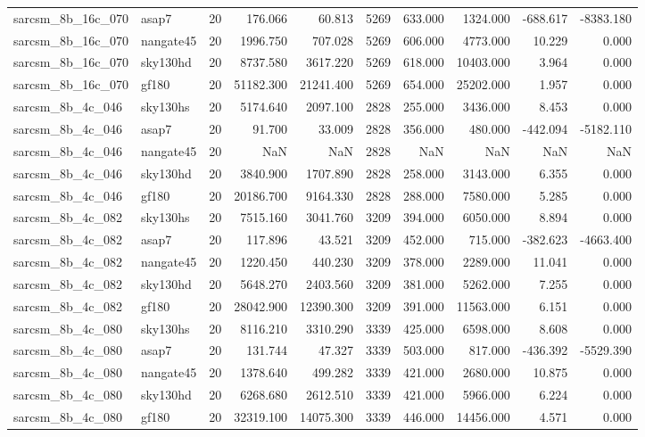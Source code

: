 \begin{longtable}{llrrrrrrrr}
sarcsm\_8b\_16c\_070 & asap7 & 20 & 176.066 & 60.813 & 5269 & 633.000 & 1324.000 & -688.617 & -8383.180 \\
sarcsm\_8b\_16c\_070 & nangate45 & 20 & 1996.750 & 707.028 & 5269 & 606.000 & 4773.000 & 10.229 & 0.000 \\
sarcsm\_8b\_16c\_070 & sky130hd & 20 & 8737.580 & 3617.220 & 5269 & 618.000 & 10403.000 & 3.964 & 0.000 \\
sarcsm\_8b\_16c\_070 & gf180 & 20 & 51182.300 & 21241.400 & 5269 & 654.000 & 25202.000 & 1.957 & 0.000 \\
sarcsm\_8b\_4c\_046 & sky130hs & 20 & 5174.640 & 2097.100 & 2828 & 255.000 & 3436.000 & 8.453 & 0.000 \\
sarcsm\_8b\_4c\_046 & asap7 & 20 & 91.700 & 33.009 & 2828 & 356.000 & 480.000 & -442.094 & -5182.110 \\
sarcsm\_8b\_4c\_046 & nangate45 & 20 & NaN & NaN & 2828 & NaN & NaN & NaN & NaN \\
sarcsm\_8b\_4c\_046 & sky130hd & 20 & 3840.900 & 1707.890 & 2828 & 258.000 & 3143.000 & 6.355 & 0.000 \\
sarcsm\_8b\_4c\_046 & gf180 & 20 & 20186.700 & 9164.330 & 2828 & 288.000 & 7580.000 & 5.285 & 0.000 \\
sarcsm\_8b\_4c\_082 & sky130hs & 20 & 7515.160 & 3041.760 & 3209 & 394.000 & 6050.000 & 8.894 & 0.000 \\
sarcsm\_8b\_4c\_082 & asap7 & 20 & 117.896 & 43.521 & 3209 & 452.000 & 715.000 & -382.623 & -4663.400 \\
sarcsm\_8b\_4c\_082 & nangate45 & 20 & 1220.450 & 440.230 & 3209 & 378.000 & 2289.000 & 11.041 & 0.000 \\
sarcsm\_8b\_4c\_082 & sky130hd & 20 & 5648.270 & 2403.560 & 3209 & 381.000 & 5262.000 & 7.255 & 0.000 \\
sarcsm\_8b\_4c\_082 & gf180 & 20 & 28042.900 & 12390.300 & 3209 & 391.000 & 11563.000 & 6.151 & 0.000 \\
sarcsm\_8b\_4c\_080 & sky130hs & 20 & 8116.210 & 3310.290 & 3339 & 425.000 & 6598.000 & 8.608 & 0.000 \\
sarcsm\_8b\_4c\_080 & asap7 & 20 & 131.744 & 47.327 & 3339 & 503.000 & 817.000 & -436.392 & -5529.390 \\
sarcsm\_8b\_4c\_080 & nangate45 & 20 & 1378.640 & 499.282 & 3339 & 421.000 & 2680.000 & 10.875 & 0.000 \\
sarcsm\_8b\_4c\_080 & sky130hd & 20 & 6268.680 & 2612.510 & 3339 & 421.000 & 5966.000 & 6.224 & 0.000 \\
sarcsm\_8b\_4c\_080 & gf180 & 20 & 32319.100 & 14075.300 & 3339 & 446.000 & 14456.000 & 4.571 & 0.000 \\

\end{longtable}
